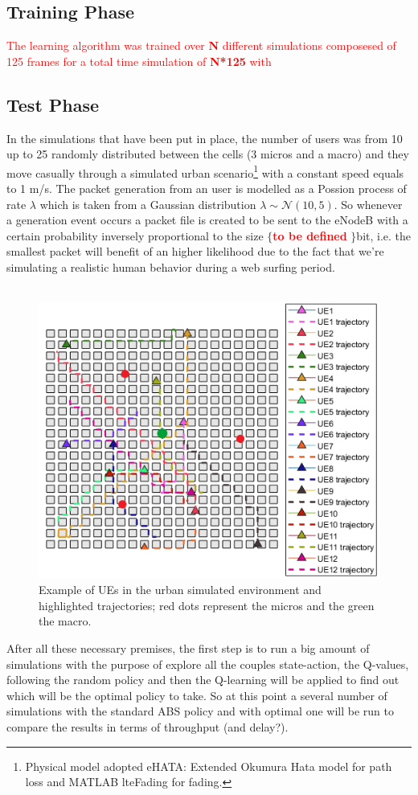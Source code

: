 \documentclass[conference,10pt]{IEEEtran}
\begin{document}
\subsection{Training Phase}
\textcolor{red}{The learning algorithm was trained over \textbf{N} different simulations composesed of 125 frames for a total time simulation of \textbf{N*125} with }
\subsection{Test Phase}
In the simulations that have been put in place, the number of users was from 10 up to 25 randomly distributed between the cells (3 micros and a macro) and they move casually through a simulated urban scenario\footnote{Physical model adopted eHATA: Extended Okumura Hata model for path loss and MATLAB lteFading for fading.}  with a constant speed equals to 1 m/s. The packet generation from an user is modelled as a Possion process of rate $\lambda$ which is taken from a Gaussian distribution $\lambda \sim \mathcal{N}(10,5)$. So whenever a generation event occurs a packet file is created to be sent to the eNodeB with a certain probability inversely proportional to the size $\lbrace$\textcolor{red}{\textbf{to be defined}} $\rbrace$bit, i.e. the smallest packet will benefit of an higher likelihood due to the fact that we're simulating a realistic human behavior during a web surfing period.\\
\\
\begin{figure}[h]
\includegraphics[scale=0.68]{figures/traj.png}
\caption{Example of UEs in the urban simulated environment and highlighted trajectories; red dots represent the micros and the green the macro.} 
\end{figure}
After all these necessary premises, the first step is to run a big amount of simulations with the purpose of explore all the couples state-action, the Q-values, following the random policy and then the Q-learning will be applied to find out which will be the optimal policy to take. So at this point a several number of simulations with the standard ABS policy and with optimal one will be run to compare the results in terms of throughput (and delay?).         
\end{document}
